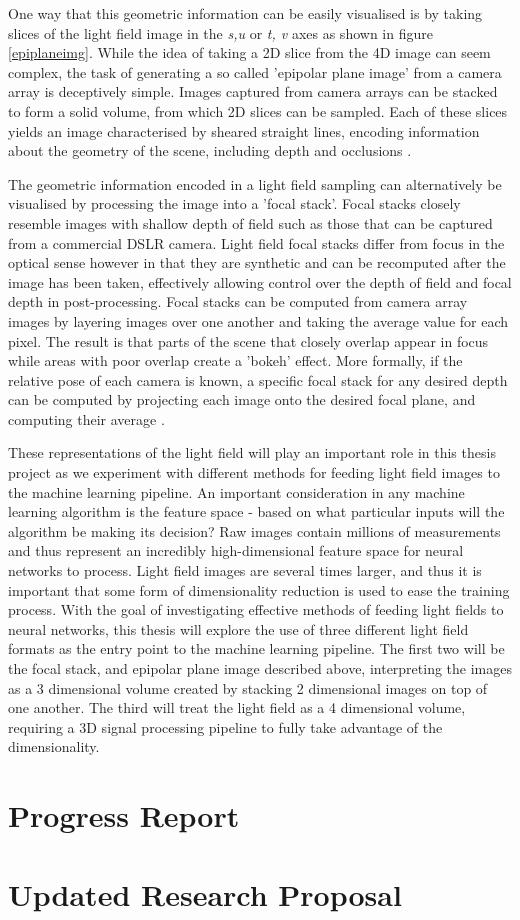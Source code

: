 \documentclass[openany]{book}
\begin{document}
One way that this geometric information can be easily visualised is by taking slices of the light field image in the \textit{s,u} or \textit{t, v} axes as shown in figure \ref{epiplaneimg}. While the idea of taking a 2D slice from the 4D image can seem complex, the task of generating a so called 'epipolar plane image' from a camera array is deceptively simple. Images captured from camera arrays can be stacked to form a solid volume, from which 2D slices can be sampled. Each of these slices yields an image characterised by sheared straight lines, encoding information about the geometry of the scene, including depth and occlusions \cite{bolles1987epiplane}. 

The geometric information encoded in a light field sampling can alternatively be visualised by processing the image into a 'focal stack'. Focal stacks closely resemble images with shallow depth of field such as those that can be captured from a commercial DSLR camera. Light field focal stacks differ from focus in the optical sense however in that they are synthetic and can be recomputed after the image has been taken, effectively allowing control over the depth of field and focal depth in post-processing. Focal stacks can be computed from camera array images by layering images over one another and taking the average value for each pixel. The result is that parts of the scene that closely overlap appear in focus while areas with poor overlap create a 'bokeh' effect. More formally, if the relative pose of each camera is known, a specific focal stack for any desired depth can be computed by projecting each image onto the desired focal plane, and computing their average \cite{vaish2004parallax}.

These representations of the light field will play an important role in this thesis project as we experiment with different methods for feeding light field images to the machine learning pipeline. An important consideration in any machine learning algorithm is the feature space - based on what particular inputs will the algorithm be making its decision? Raw images contain millions of measurements and thus represent an incredibly high-dimensional feature space for neural networks to process. Light field images are several times larger, and thus it is important that some form of dimensionality reduction is used to ease the training process. With the goal of investigating effective methods of feeding light fields to neural networks, this thesis will explore the use of three different light field formats as the entry point to the machine learning pipeline. The first two will be the focal stack, and epipolar plane image described above, interpreting the images as a 3 dimensional volume created by stacking 2 dimensional images on top of one another. The third will treat the light field as a 4 dimensional volume, requiring a 3D signal processing pipeline to fully take advantage of the dimensionality.


\chapter{Progress Report}

\chapter{Updated Research Proposal}


\newpage



\end{document}
